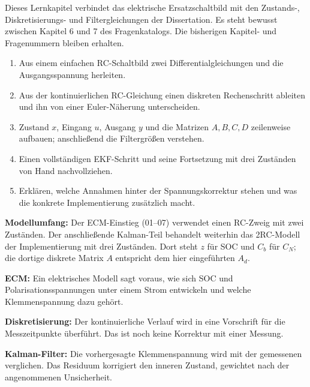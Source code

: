 \providecommand{\ecmpage}[1]{\clearpage\section*{\color{accent}#1}}
\label{ecm:start}
Dieses Lernkapitel verbindet das elektrische Ersatzschaltbild mit den Zustands-, Diskretisierungs- und Filtergleichungen der Dissertation. Es steht bewusst zwischen Kapitel 6 und 7 des Fragenkatalogs. Die bisherigen Kapitel- und Fragenummern bleiben erhalten.

\begin{enumerate}
\item Aus einem einfachen RC-Schaltbild zwei Differentialgleichungen und die Ausgangsspannung herleiten.
\item Aus der kontinuierlichen RC-Gleichung einen diskreten Rechenschritt ableiten und ihn von einer Euler-Näherung unterscheiden.
\item Zustand $x$, Eingang $u$, Ausgang $y$ und die Matrizen $A,B,C,D$ zeilenweise aufbauen; anschließend die Filtergrößen verstehen.
\item Einen vollständigen EKF-Schritt und seine Fortsetzung mit drei Zuständen von Hand nachvollziehen.
\item Erklären, welche Annahmen hinter der Spannungskorrektur stehen und was die konkrete Implementierung zusätzlich macht.
\end{enumerate}

\textbf{Modellumfang:} Der ECM-Einstieg (01--07) verwendet einen RC-Zweig mit zwei Zuständen. Der anschließende Kalman-Teil behandelt weiterhin das 2RC-Modell der Implementierung mit drei Zuständen. Dort steht $z$ für SOC und $C_b$ für $C_N$; die dortige diskrete Matrix $A$ entspricht dem hier eingeführten $A_d$.

\textbf{ECM:} Ein elektrisches Modell sagt voraus, wie sich SOC und Polarisationsspannungen unter einem Strom entwickeln und welche Klemmenspannung dazu gehört.

\textbf{Diskretisierung:} Der kontinuierliche Verlauf wird in eine Vorschrift für die Messzeitpunkte überführt. Das ist noch keine Korrektur mit einer Messung.

\textbf{Kalman-Filter:} Die vorhergesagte Klemmenspannung wird mit der gemessenen verglichen. Das Residuum korrigiert den inneren Zustand, gewichtet nach der angenommenen Unsicherheit.

